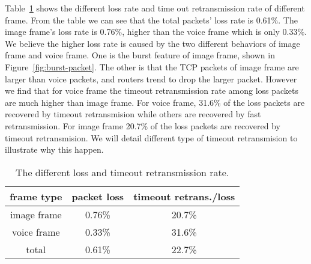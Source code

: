 Table~\ref{tbl:loss-timeout-rate} shows the different loss rate and time out retransmission rate of different frame. From the table we can see that the total packets' loss rate is 0.61\%.  The image frame's loss rate is 0.76\%, higher than the voice frame which is only 0.33\%. We believe the higher loss rate is caused by the two different behaviors of image frame and voice frame. One is the burst feature of image frame, shown in Figure~\ref{fig:burst-packet}. The other is that the TCP packets of image frame are larger than voice packets, and routers trend to drop the larger packet. However we find that for voice frame the timeout retransmission rate among loss packets are much higher than image frame. For voice frame, 31.6\% of the loss packets are recovered by timeout retransmision while others are recovered by fast retransmission. For image frame 20.7\% of the loss packets are recovered by timeout retransmision. We will detail different type of timeout retransmision to illustrate why this happen. 

\begin{table}[ht]
\tablefontsize
\renewcommand{\arraystretch}{\assize}
 \setlength{\tabcolsep}{3pt}
\caption{The different loss and timeout retransmission rate.}
\centering
\begin{tabular}{c|c|c}
	\toprule
	 frame type & packet loss  &  timeout retrans./loss \\
	\hline
	image frame & 0.76\%  & 20.7\% \\
	\hline
	voice frame & 0.33\% & 31.6\% \\
	\hline
	total & 0.61\%  & 22.7\% \\
	\bottomrule
\end{tabular}
\label{tbl:loss-timeout-rate}
\termspace
\end{table}  


